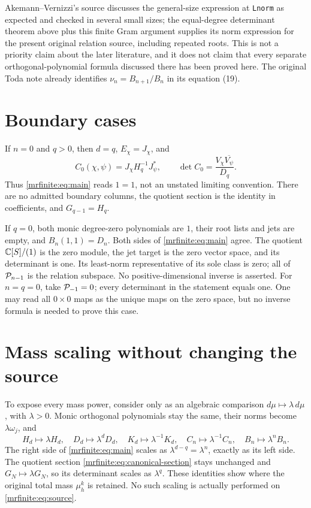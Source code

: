 \documentclass[11pt]{article}
\begin{document}
Akemann--Vernizzi's source discusses the general-size expression at
\texttt{Lnorm} as expected and checked in several small sizes; the
equal-degree determinant theorem above plus this finite Gram argument
supplies its norm expression for the present original relation source,
including repeated roots. This is not a priority claim about the later
literature, and it does not claim that every separate orthogonal-polynomial
formula discussed there has been proved here. The original Toda note
already identifies \(\nu_n=B_{n+1}/B_n\) in its equation (19).

\section{Boundary cases}\label{mrfinite:sec:boundary}

If \(n=0\) and \(q>0\), then \(d=q\), \(E_\chi=J_\chi\), and
\[
 C_0(\chi,\psi)=J_\chi H_q^{-1}J_\psi^*,\qquad
 \det C_0=\frac{V_\chi\overline{V_\psi}}{D_q}.
\]
Thus \eqref{mrfinite:eq:main} reads \(1=1\), not an unstated limiting convention.
There are no admitted boundary columns, the quotient section is the
identity in coefficients, and \(G_{q-1}=H_q\).

If \(q=0\), both monic degree-zero polynomials are \(1\), their root
lists and jets are empty, and \(B_n(1,1)=D_n\). Both sides of
\eqref{mrfinite:eq:main} agree. The quotient \(\mathbb C[S]/(1)\) is the zero module,
the jet target is the zero vector space, and its determinant is one.
Its least-norm representative of its sole class is zero; all of
\(\mathcal P_{n-1}\) is the relation subspace. No positive-dimensional inverse
is asserted. For \(n=q=0\), take \(\mathcal P_{-1}=0\); every determinant in
the statement equals one. One may read all \(0\times0\) maps as the
unique maps on the zero space, but no inverse formula is needed to prove
this case.

\section{Mass scaling without changing the source}\label{mrfinite:sec:mass}

To expose every mass power, consider only as an algebraic comparison
\(d\mu\mapsto\lambda\,d\mu\), with \(\lambda>0\). Monic
orthogonal polynomials stay the same, their norms become
\(\lambda\omega_j\), and
\[
 H_d\mapsto\lambda H_d,\quad D_d\mapsto\lambda^dD_d,
 \quad K_d\mapsto\lambda^{-1}K_d,\quad
 C_n\mapsto\lambda^{-1}C_n,\quad B_n\mapsto\lambda^nB_n.
\]
The right side of \eqref{mrfinite:eq:main} scales as
\(\lambda^{d-q}=\lambda^n\), exactly as its left side.
The quotient section \eqref{mrfinite:eq:canonical-section} stays unchanged and
\(G_N\mapsto\lambda G_N\), so its determinant scales as
\(\lambda^q\). These identities show where the original total mass
\(\mu_h^k\) is retained. No such scaling is actually performed on
\eqref{mrfinite:eq:source}.
\end{document}
